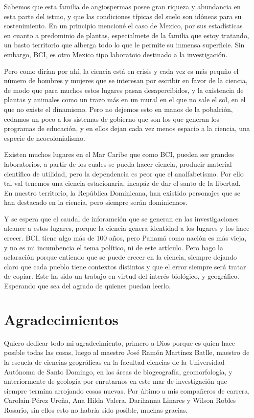 \documentclass[11pt,]{article}
\begin{document}
Sabemos que esta familia de angiospermas posee gran riqueza y abundancia
en esta parte del istmo, y que las condiciones típicas del suelo son
idóneas para su sostenimiento. En un principio mencioné el caso de
Mexico, por sus estadísticas en cuanto a predominio de plantas,
especialmete de la familia que estoy tratando, un basto territorio que
alberga todo lo que le permite su inmensa superficie. Sin embargo, BCI,
es otro Mexico tipo laboratoio destinado a la investigación.

Pero como dirían por ahí, la ciencia está en crisis y cada vez es más
pequño el número de hombres y mujeres que se interesan por escribir en
favor de la ciencia, de modo que para muchos estos lugares pasan
desapercibidos, y la existencia de plantas y animales como un trazo más
en un mural en el que no sale el sol, en el que no existe el dinamismo.
Pero no dejemos esto en manos de la pobalción, cedamos un poco a los
sistemas de gobierno que son los que generan los programas de educación,
y en ellos dejan cada vez menos espacio a la ciencia, una especie de
neocolonialismo.

Existen muchos lugares en el Mar Caribe que como BCI, pueden ser grandes
laboratorios, a partir de los cuales se pueda hacer ciencia, producir
material científico de utilidad, pero la dependencia es peor que el
analfabetismo. Por ello tal val tenemos una ciencia estacionaria,
incapáz de dar el santo de la libertad. En nuestro territorio, la
República Dominicana, han existido personajes que se han destacado en la
ciencia, pero siempre serán dominicnaos.

Y se espera que el caudal de inforamción que se generan en las
investigaciones alcance a estos lugares, porque la ciencia genera
identidad a los lugares y los hace crecer. BCI, tiene algo más de 100
años, pero Panamá como nación es más vieja, y no es mi incumbencia el
tema político, ni de este artículo. Pero hago la aclaración porque
entiendo que se puede crecer en la ciencia, siempre dejando claro que
cada pueblo tiene contextos distintos y que el error siempre será tratar
de copiar. Este ha sido un trabajo en virtud del interés biológico, y
geográfico. Esperando que sea del agrado de quienes puedan leerlo.

\section{Agradecimientos}\label{agradecimientos}

Quiero dedicar todo mi agradecimiento, primero a Dios porque es quien
hace posible todas las cosas, luego al maestro José Ramón Martínez
Batlle, maestro de la escuela de ciencias geográficas en la facultad
ciencias de la Universidad Autónoma de Santo Domingo, en las áreas de
biogeografía, geomorfología, y anteriormente de geología por enrutarnos
en este mar de investigación que siempre termina arrojando cosas nuevas.
Por último a mis compañeros de carrera, Carolain Pérez Ureña, Ana Hilda
Valera, Darihanna Linares y Wilson Robles Rosario, sin ellos esto no
habría sido posible, muchas gracias.
\end{document}
